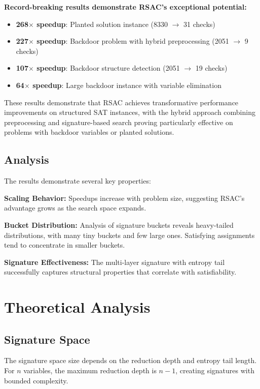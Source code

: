 \documentclass[conference]{IEEEtran}
\begin{document}
\textbf{Record-breaking results demonstrate RSAC's exceptional potential:}
\begin{itemize}
\item \textbf{268$\times$ speedup}: Planted solution instance (8330 $\rightarrow$ 31 checks)
\item \textbf{227$\times$ speedup}: Backdoor problem with hybrid preprocessing (2051 $\rightarrow$ 9 checks)
\item \textbf{107$\times$ speedup}: Backdoor structure detection (2051 $\rightarrow$ 19 checks)
\item \textbf{64$\times$ speedup}: Large backdoor instance with variable elimination
\end{itemize}

These results demonstrate that RSAC achieves transformative performance improvements on structured SAT instances, with the hybrid approach combining preprocessing and signature-based search proving particularly effective on problems with backdoor variables or planted solutions.

\subsection{Analysis}

The results demonstrate several key properties:

\textbf{Scaling Behavior:} Speedups increase with problem size, suggesting RSAC's advantage grows as the search space expands.

\textbf{Bucket Distribution:} Analysis of signature buckets reveals heavy-tailed distributions, with many tiny buckets and few large ones. Satisfying assignments tend to concentrate in smaller buckets.

\textbf{Signature Effectiveness:} The multi-layer signature with entropy tail successfully captures structural properties that correlate with satisfiability.

\section{Theoretical Analysis}

\subsection{Signature Space}

The signature space size depends on the reduction depth and entropy tail length. For $n$ variables, the maximum reduction depth is $n-1$, creating signatures with bounded complexity.
\end{document}
